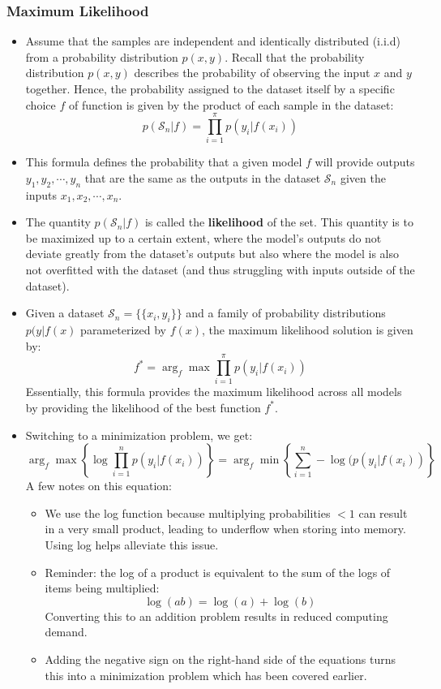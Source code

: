 \documentclass{article}
\newcommand{\tbf}[1]{\textbf{#1}}
\begin{document}
\subsubsection{Maximum Likelihood}

\begin{itemize}
    \item Assume that the samples are independent and identically distributed (i.i.d) from a probability distribution $p(x,y)$. Recall that the probability distribution $p(x,y)$ describes the probability of observing the input $x$ and $y$ together. Hence, the probability assigned to the dataset itself by a specific choice $f$ of function is given by the product of each sample in the dataset:
    \[p(\mathcal{S}_n|f) = \prod^{\pi}_{i=1}p(y_i|f(x_i))\]
    \item This formula defines the probability that a given model $f$ will provide outputs $y_1, y_2, \cdots, y_n$ that are the same as the outputs in the dataset $\mathcal{S}_n$ given the inputs $x_1, x_2, \cdots, x_n$.
    \item The quantity $p(\mathcal{S}_n | f)$ is called the \tbf{likelihood} of the set. This quantity is to be maximized up to a certain extent, where the model's outputs do not deviate greatly from the dataset's outputs but also where the model is also not overfitted with the dataset (and thus struggling with inputs outside of the dataset).
    \item Given a dataset $\mathcal{S}_n=\{\{x_i, y_i\}\}$ and a family of probability distributions $p(y|f(x)$ parameterized by $f(x)$, the maximum likelihood solution is given by:
    \[f^* = \arg _f \max \prod ^\pi _{i=1} p(y_i|f(x_i))\]
    Essentially, this formula provides the maximum likelihood across all models by providing the likelihood of the best function $f^*$.
    \item Switching to a minimization problem, we get:
    \[
    \arg _f \max \left\{ \log \prod ^n _{i=1} p(y_i|f(x_i))\right\} = \arg _f \min \left\{\sum^n_{i=1} -\log(p(y_i|f(x_i))\right\}
    \]
    A few notes on this equation:
    \begin{itemize}
        \item We use the log function because multiplying probabilities $<1$ can result in a very small product, leading to underflow when storing into memory. Using log helps alleviate this issue.
        \item Reminder: the log of a product is equivalent to the sum of the logs of items being multiplied:
        \[\log (ab)= \log(a) + \log(b)\]
        Converting this to an addition problem results in reduced computing demand.
        \item Adding the negative sign on the right-hand side of the equations turns this into a minimization problem which has been covered earlier.
    \end{itemize}
    \end{itemize}
\end{document}
